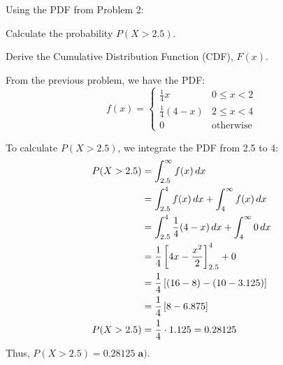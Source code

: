 \documentclass[a4paper, 10pt]{article}
\begin{document}
\begin{problem}
Using the PDF from Problem 2:
\begin{subproblems_alpha}
	\item Calculate the probability \( P(X > 2.5) \).
	\item Derive the Cumulative Distribution Function (CDF), \( F(x) \).
\end{subproblems_alpha}
\end{problem}

\begin{solution}
	From the previous problem, we have the PDF:
	\[
		f(x) = \begin{cases}
			\tfrac{1}{4}x       & 0 \leq x < 2     \\
			\tfrac{1}{4}(4 - x) & 2 \leq x < 4     \\
			0                   & \text{otherwise}
		\end{cases}
	\]

	To calculate \( P(X > 2.5) \), we integrate the PDF from 2.5 to 4:
	\begin{align*}
		P(X > 2.5) & = \int_{2.5}^{\infty} f(x)\,dx                                    \\
		           & = \int_{2.5}^{4} f(x)\,dx + \int_{4}^{\infty} f(x)\,dx            \\
		           & = \int_{2.5}^{4} \frac{1}{4}(4 - x)\,dx + \int_{4}^{\infty} 0\,dx \\
		           & = \frac{1}{4} \left[4x - \frac{x^2}{2}\right]_{2.5}^{4} + 0        \\
		           & = \frac{1}{4} \left[(16 - 8) - (10 - 3.125)\right]                 \\
		           & = \frac{1}{4} \left[8 - 6.875\right]                               \\
		P(X > 2.5) & = \frac{1}{4} \cdot 1.125 = 0.28125
	\end{align*}
	Thus, \( P(X > 2.5) = \boxed{0.28125} \; \textbf{a).} \)

	\myspace


\end{solution}
\end{document}
